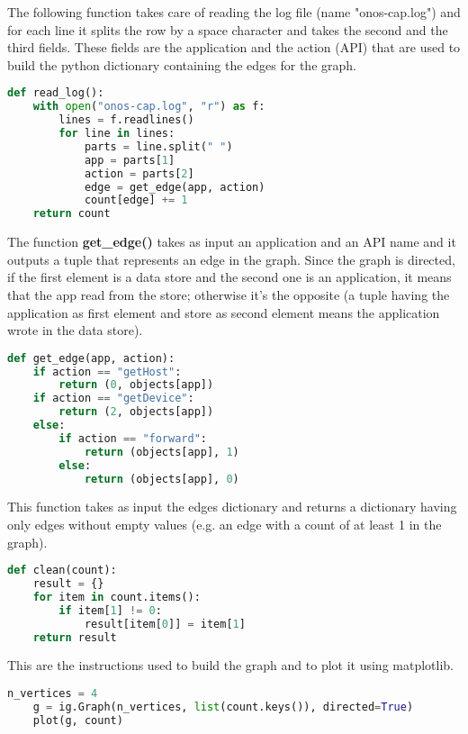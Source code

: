 \documentclass[a4paper,10pt]{memoir}
\begin{document}
The following function takes care of reading the log file (name "onos-cap.log") and for each line it splits the row by a space character and takes the second and the third fields. These fields are the application and the action (API) that are used to build the python dictionary containing the edges for the graph.
\begin{lstlisting}[language=python,firstnumber=39]
def read_log():
    with open("onos-cap.log", "r") as f:
        lines = f.readlines()
        for line in lines:
            parts = line.split(" ")
            app = parts[1]
            action = parts[2]
            edge = get_edge(app, action)
            count[edge] += 1
    return count
\end{lstlisting}

The function \textbf{get\_edge()} takes as input an application and an API name and it outputs a tuple that represents an edge in the graph. Since the graph is directed, if the first element is a data store and the second one is an application, it means that the app read from the store; otherwise it's the opposite (a tuple having the application as first element and store as second element means the application wrote in the data store).
\begin{lstlisting}[language=python,firstnumber=52]
def get_edge(app, action):
    if action == "getHost":
        return (0, objects[app])
    if action == "getDevice":
        return (2, objects[app])
    else:
        if action == "forward":
            return (objects[app], 1)
        else:
            return (objects[app], 0)
\end{lstlisting}

This function takes as input the edges dictionary and returns a dictionary having only edges without empty values (e.g. an edge with a count of at least 1 in the graph).
\begin{lstlisting}[language=python,firstnumber=52]
def clean(count):
    result = {}
    for item in count.items():
        if item[1] != 0:
            result[item[0]] = item[1]
    return result
\end{lstlisting}

This are the instructions used to build the graph and to plot it using matplotlib.
\begin{lstlisting}[language=python,firstnumber=185]
    n_vertices = 4
    g = ig.Graph(n_vertices, list(count.keys()), directed=True)
    plot(g, count)
\end{lstlisting}
\end{document}
